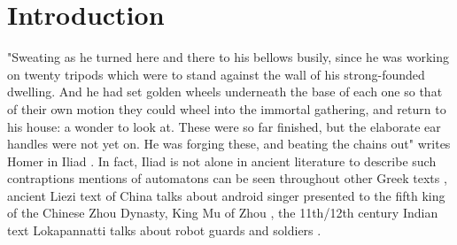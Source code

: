 \section{Introduction}
\label{sec:-intro}
"Sweating as he turned here and there to his bellows busily, since he was working on twenty tripods which were to stand against the wall of his strong-founded dwelling. And he had set golden wheels underneath the base of each one so that of their own motion they could wheel into the immortal gathering, and return to his house: a wonder to look at. These were so far finished, but the elaborate ear handles were not yet on. He was forging these, and beating the chains out" writes Homer in Iliad \cite{homer1194iliad}. In fact, Iliad is not alone in ancient literature to describe such contraptions mentions of  automatons can be seen throughout other Greek texts \cite{aaron2015automatones}, ancient Liezi text of China talks about android singer presented to the fifth king of the Chinese Zhou Dynasty, King Mu of Zhou \cite{lie600liezi}, the 11th/12th century Indian text Lokapannatti talks about robot guards and soldiers \cite{sarah1997lokapannatti}. 


